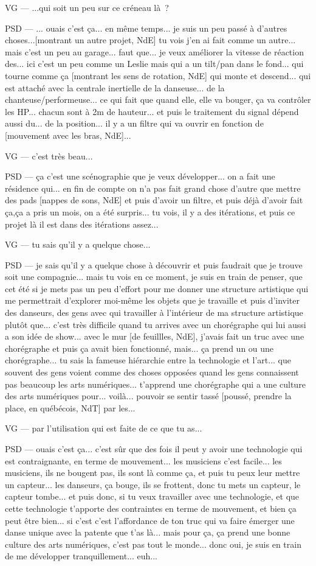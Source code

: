 VG — ...qui soit un peu sur ce créneau là ?

PSD — ... ouais c'est ça... en même temps... je suis un peu passé à d'autres choses...[montrant un autre projet, NdE]  tu vois j'en ai fait comme un autre... mais c'est un peu au garage... faut que... je veux améliorer la vitesse de réaction des... ici c'est un peu comme un Leslie  mais qui a un tilt/pan dans le fond... qui tourne comme ça [montrant les sens de rotation, NdE] qui monte et descend... qui est attaché avec la centrale inertielle de la danseuse... de la chanteuse/performeuse... ce qui fait que quand elle, elle va bouger, ça va contrôler les HP... chacun sont à 2m de hauteur... et puis le traitement du signal dépend aussi du... de la position... il y a un filtre qui va ouvrir en fonction de [mouvement avec les bras, NdE]...

VG — c'est très beau...

PSD — ça c'est une scénographie que je veux développer... on a fait une résidence qui... en fin de compte on n'a pas fait grand chose d'autre que mettre des pads [nappes de sons, NdE] et puis d'avoir un filtre, et puis déjà d'avoir fait ça,ça a pris un mois, on a été surpris... tu vois, il y a des itérations, et puis ce projet là il est dans des itérations assez...

VG — tu sais qu'il y a quelque chose...

PSD — je sais qu'il y a quelque chose à découvrir et puis faudrait que je trouve soit une compagnie... mais tu vois en ce moment, je suis en train de penser, que cet été si je mets pas un peu d'effort pour me donner une structure artistique qui me permettrait d'explorer moi-même les objets que je travaille et puis d'inviter des danseurs, des gens avec qui travailler à l'intérieur de ma structure artistique plutôt que... c'est très difficile quand tu arrives avec un chorégraphe qui lui aussi a son idée de show... avec le mur [de feuillles, NdE], j'avais fait un truc avec une chorégraphe et puis ça avait bien fonctionné, mais... ça prend un ou une chorégraphe... tu sais la fameuse hiérarchie entre la technologie et l'art... que souvent des gens voient comme des choses opposées quand les gens connaissent pas beaucoup les arts numériques... t'apprend une chorégraphe qui a une culture des arts numériques pour... voilà... pouvoir se sentir tassé [poussé, prendre la place, en québécois, NdT]  par les...

VG — par l'utilisation qui est faite de ce que tu as...

PSD — ouais c'est ça... c'est sûr que des fois il peut y avoir une technologie qui est contraignante, en terme de mouvement... les musiciens c'est facile... les musiciens, ils ne bougent pas, ils sont là comme ça, et puis  tu peux leur mettre un capteur... les danseurs, ça bouge, ils se frottent, donc tu mets un capteur, le capteur tombe... et puis donc, si tu veux travailler avec une technologie, et que cette technologie t'apporte des contraintes en terme de mouvement, et bien ça peut être bien... si c'est c'est l'affordance de ton truc qui va faire émerger une danse unique avec la patente que t'as là... mais pour ça, ça prend une bonne culture des arts numériques, c'est pas tout le monde... donc oui, je suis en train de me développer tranquillement... euh...


